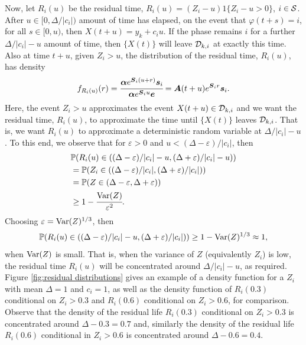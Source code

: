Now, let \(R_i(u)\) be the residual time, \(R_i(u) = (Z_i-u)1\{Z_i-u>0\}\), \(i\in\mathcal{S}\). After \(u\in[0,\Delta/|c_i|)\) amount of time has elapsed, on the event that \(\varphi(t+s)=i\), for all \(s\in[0,u)\), then \(X(t+u) = y_k + c_i u\). If the phase remains \(i\) for a further \(\Delta/|c_i|-u\) amount of time, then \(\{X(t)\}\) will leave \(\mathcal{D}_{k,i}\) at exactly this time. Also at time \(t+u\), given \(Z_i>u\), the distribution of the residual time, \(R_i(u)\), has density 
\[f_{R_i(u)}(r) = \cfrac{\boldsymbol\alpha e^{\boldsymbol S_i(u+ r) } \boldsymbol s_i}{\boldsymbol\alpha e^{\boldsymbol S_iu } \boldsymbol e} = \boldsymbol A(t+u) e^{\boldsymbol S_i r}  \boldsymbol s_i.\]
Here, the event \(Z_i>u\) approximates the event \(X(t+u)\in\mathcal{D}_{k,i}\) and we want the residual time, \(R_i(u)\), to approximate the time until \(\{X(t)\}\) leaves \(\mathcal{D}_{k,i}\). That is, we want \(R_i(u)\) to approximate a deterministic random variable at \(\Delta/|c_i| - u\). To this end, we observe that for \(\varepsilon>0\) and \(u<(\Delta-\varepsilon)/|c_i|\), then
\begin{align*}
	&\mathbb P(R_i(u) \in ((\Delta-\varepsilon)/|c_i|-u, (\Delta+\varepsilon)/|c_i|-u) ) 
	\\&= \mathbb P(Z_i\in ((\Delta-\varepsilon)/|c_i|, (\Delta+\varepsilon)/|c_i|) ) 
	\\&= \mathbb P(Z\in (\Delta-\varepsilon, \Delta + \varepsilon))
	\\&\geq 1-\cfrac{\mathrm{Var}(Z)}{\varepsilon^2}.
\end{align*}
Choosing \(\varepsilon = \mathrm{Var}(Z)^{1/3}\), then 
\[\mathbb P(R_i(u) \in ((\Delta-\varepsilon)/|c_i|-u, (\Delta+\varepsilon)/|c_i|) )\geq 1-\mathrm{Var}(Z)^{1/3} \approx 1, \]
when \(\mathrm{Var}(Z)\) is small. 
That is, when the variance of \(Z\) (equivalently \(Z_i\)) is low, the residual time \(R_i(u)\) will be concentrated around \(\Delta/|c_i| - u\), as required. Figure \ref{fig:residual distributions} gives an example of a density function for a \(Z_i\) with mean \(\Delta=1\) and \(c_i=1\), as well as the density function of \(R_i(0.3)\) conditional on \(Z_i>0.3\) and \(R_i(0.6)\) conditional on \(Z_i>0.6\), for comparison. Observe that the density of the residual life \(R_i(0.3)\) conditional on \(Z_i>0.3\) is concentrated around \(\Delta-0.3 = 0.7\) and, similarly the density of the residual life \(R_i(0.6)\) conditional in \(Z_i>0.6\) is concentrated around \(\Delta-0.6 = 0.4\).

